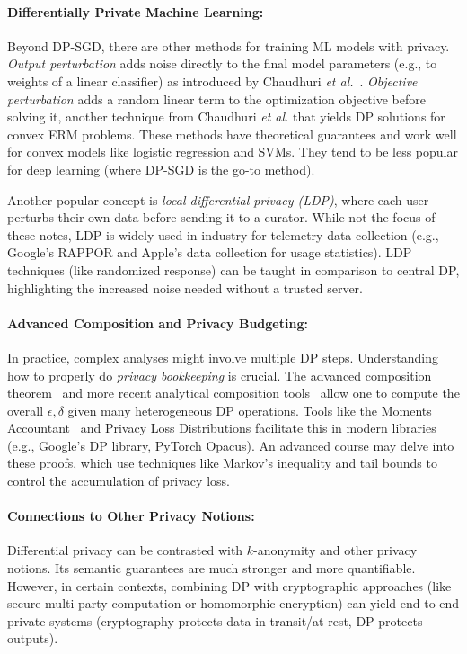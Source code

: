 \documentclass[11pt]{article}
\theoremstyle{remark}
\theoremstyle{definition}
\theoremstyle{plain}
\begin{document}
\paragraph{Differentially Private Machine Learning:} Beyond DP-SGD, there are other methods for training ML models with privacy. \emph{Output perturbation} adds noise directly to the final model parameters (e.g., to weights of a linear classifier) as introduced by Chaudhuri \textit{et al.}~\cite{Chaudhuri2011}. \emph{Objective perturbation} adds a random linear term to the optimization objective before solving it, another technique from Chaudhuri \textit{et al.} that yields DP solutions for convex ERM problems. These methods have theoretical guarantees and work well for convex models like logistic regression and SVMs. They tend to be less popular for deep learning (where DP-SGD is the go-to method).

Another popular concept is \emph{local differential privacy (LDP)}, where each user perturbs their own data before sending it to a curator. While not the focus of these notes, LDP is widely used in industry for telemetry data collection (e.g., Google's RAPPOR and Apple's data collection for usage statistics). LDP techniques (like randomized response) can be taught in comparison to central DP, highlighting the increased noise needed without a trusted server.

\paragraph{Advanced Composition and Privacy Budgeting:} In practice, complex analyses might involve multiple DP steps. Understanding how to properly do \emph{privacy bookkeeping} is crucial. The advanced composition theorem~\cite{DworkRoth2014} and more recent analytical composition tools~\cite{Kairouz2017} allow one to compute the overall $\epsilon,\delta$ given many heterogeneous DP operations. Tools like the Moments Accountant~\cite{Abadi2016} and Privacy Loss Distributions facilitate this in modern libraries (e.g., Google's DP library, PyTorch Opacus). An advanced course may delve into these proofs, which use techniques like Markov's inequality and tail bounds to control the accumulation of privacy loss.

\paragraph{Connections to Other Privacy Notions:} Differential privacy can be contrasted with $k$-anonymity and other privacy notions. Its semantic guarantees are much stronger and more quantifiable. However, in certain contexts, combining DP with cryptographic approaches (like secure multi-party computation or homomorphic encryption) can yield end-to-end private systems (cryptography protects data in transit/at rest, DP protects outputs).
\end{document}
